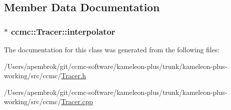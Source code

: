 \subsection{Member Data Documentation}
\hypertarget{classccmc_1_1_tracer_ae7a4953e9ca43eb93535b869864f6062}{
\subsubsection[{interpolator}]{$\ast$ ccmc\-::\-Tracer\-::interpolator}}\label{classccmc_1_1_tracer_ae7a4953e9ca43eb93535b869864f6062}


The documentation for this class was generated from the following files\-:\begin{DoxyCompactItemize}
\item 
/\-Users/apembrok/git/ccmc-\/software/kameleon-\/plus/trunk/kameleon-\/plus-\/working/src/ccmc/\hyperlink{_tracer_8h}{Tracer.\-h}\item 
/\-Users/apembrok/git/ccmc-\/software/kameleon-\/plus/trunk/kameleon-\/plus-\/working/src/ccmc/\hyperlink{_tracer_8cpp}{Tracer.\-cpp}\end{DoxyCompactItemize}
